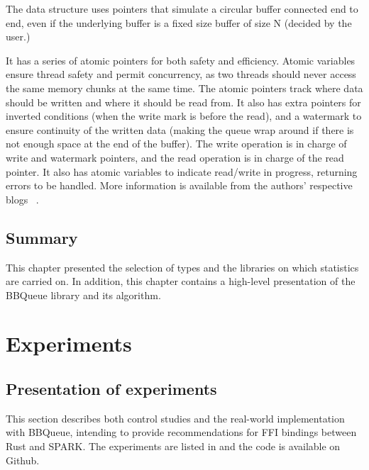 \documentclass[nomenclature, english, bibtex]{kththesis}
\begin{document}
The data structure uses pointers that simulate a circular buffer connected end to end, even if the underlying buffer is a fixed size buffer of size N (decided by the user.)  

It has a series of atomic pointers for both safety and efficiency. Atomic variables ensure thread safety and permit concurrency, as two threads should never access the same memory chunks at the same time. The atomic pointers track where data should be written and where it should be read from. It also has extra pointers for inverted conditions (when the write mark is before the read), and a watermark to ensure continuity of the written data (making the queue wrap around if there is not enough space at the end of the buffer).  The write operation is in charge of write and watermark pointers, and the read operation is in charge of the read pointer. It also has atomic variables to indicate read/write in progress, returning errors to be handled. More information is available from the authors' respective blogs ~\cite{chouteau_rust_2021, munns_design_2019}.

\section{Summary}

This chapter presented the selection of types and the libraries on which statistics are carried on. In addition, this chapter contains a high-level presentation of the BBQueue library and its algorithm.

\cleardoublepage
\chapter{Experiments}
\label{ch:whatYouDid}

\section{Presentation of experiments}

This section describes both control studies and the real-world implementation with BBQueue, intending to provide recommendations for FFI bindings between Rust and SPARK. The experiments are listed in 
and the code is available on Github.
\end{document}

